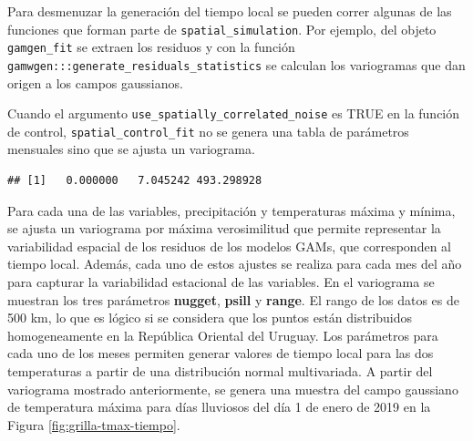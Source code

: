 \documentclass[
  12pt]{article}
\newenvironment{Shaded}{}{}
\newcommand{\CommentTok}[1]{\textcolor[rgb]{0.38,0.63,0.69}{\textit{#1}}}
\newcommand{\DataTypeTok}[1]{\textcolor[rgb]{0.56,0.13,0.00}{#1}}
\newcommand{\DecValTok}[1]{\textcolor[rgb]{0.25,0.63,0.44}{#1}}
\newcommand{\KeywordTok}[1]{\textcolor[rgb]{0.00,0.44,0.13}{\textbf{#1}}}
\newcommand{\NormalTok}[1]{#1}
\newcommand{\OperatorTok}[1]{\textcolor[rgb]{0.40,0.40,0.40}{#1}}
\newcommand{\StringTok}[1]{\textcolor[rgb]{0.25,0.44,0.63}{#1}}
\begin{document}
Para desmenuzar la generación del tiempo local se pueden correr algunas de las funciones que forman parte de \texttt{spatial\_simulation}. Por ejemplo, del objeto \texttt{gamgen\_fit} se extraen los residuos y con la función \texttt{gamwgen:::generate\_residuals\_statistics} se calculan los variogramas que dan origen a los campos gaussianos.

Cuando el argumento \texttt{use\_spatially\_correlated\_noise} es TRUE en la función de control, \texttt{spatial\_control\_fit} no se genera una tabla de parámetros mensuales sino que se ajusta un variograma.

\begin{Shaded}
\end{Shaded}

\begin{verbatim}
## [1]   0.000000   7.045242 493.298928
\end{verbatim}

Para cada una de las variables, precipitación y temperaturas máxima y mínima, se ajusta un variograma por máxima verosimilitud que permite representar la variabilidad espacial de los residuos de los modelos GAMs, que corresponden al tiempo local. Además, cada uno de estos ajustes se realiza para cada mes del año para capturar la variabilidad estacional de las variables. En el variograma se muestran los tres parámetros \textbf{nugget}, \textbf{psill} y \textbf{range}. El rango de los datos es de 500 km, lo que es lógico si se considera que los puntos están distribuidos homogeneamente en la República Oriental del Uruguay.
Los parámetros para cada uno de los meses permiten generar valores de tiempo local para las dos temperaturas a partir de una distribución normal multivariada.
A partir del variograma mostrado anteriormente, se genera una muestra del campo gaussiano de temperatura máxima para días lluviosos del día 1 de enero de 2019 en la Figura \ref{fig:grilla-tmax-tiempo}.
\end{document}
